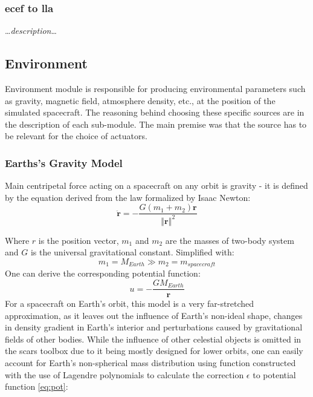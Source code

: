     \subsubsection{\ac{ecef} to \ac{lla}}
        \dots\textit{description}\dots



\subsection{Environment}
    Environment module is responsible for producing environmental parameters such as gravity, magnetic field, atmosphere density, etc., at the position of the simulated spacecraft. The reasoning behind choosing these specific sources are in the description of each sub-module. The main premise was that the source has to be relevant for the choice of actuators.
    
    \subsubsection{Earths's Gravity Model}
        Main centripetal force acting on a spacecraft on any orbit is gravity - it is defined by the equation derived from the law formalized by Isaac Newton:
        \begin{equation}
            \ddot{\textbf{r}} = -\frac{G(m_1+m_2)\textbf{r}}{\left\Vert \textbf{r} \right\Vert^2}
        \end{equation}

        Where $r$ is the position vector, $m_1$ and $m_2$ are the masses of two-body system and $G$ is the universal gravitational constant. Simplified with:
        \begin{equation}
            m_1 = M_{Earth} \gg m_2 = m_{spacecraft}
        \end{equation}
        One can derive the corresponding potential function:
        \begin{equation}
            u = -\frac{GM_{Earth}}{\textbf{r}}\label{eq:pot}
        \end{equation}
        For a spacecraft on Earth's orbit, this model is a very far-stretched approximation, as it leaves out the influence of Earth's non-ideal shape, changes in density gradient in Earth's interior and perturbations caused by gravitational fields of other bodies. While the influence of other celestial objects is omitted in the \ac{scars} toolbox due to it being mostly designed for lower orbits, one can easily account for Earth's non-spherical mass distribution using function constructed with the use of Lagendre polynomials to calculate the correction $\epsilon$ to potential function \eqref{eq:pot}:

